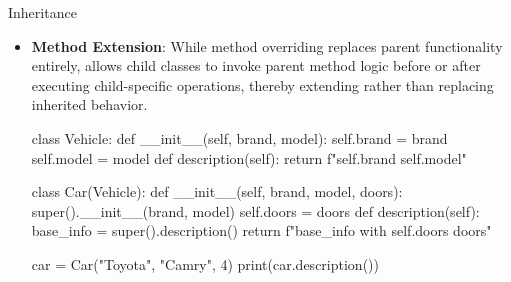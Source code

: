 \documentclass[10pt]{article}
\begin{document}
\begin{core}[label=core:inheritance]{Inheritance}
\begin{itemize}
        \item \textbf{Method Extension}: While method overriding replaces parent functionality entirely,  allows child classes to invoke parent method logic before or after executing child-specific operations, thereby extending rather than replacing inherited behavior.
        
        \begin{pyconsole}

          class Vehicle:
              def __init__(self, brand, model):
                  self.brand = brand
                  self.model = model
              def description(self):
                  return f"{self.brand} {self.model}"

          class Car(Vehicle):
              def __init__(self, brand, model, doors):
                  super().__init__(brand, model)
                  self.doors = doors
              def description(self):
                  base_info = super().description()
                  return f"{base_info} with {self.doors} doors"

          car = Car("Toyota", "Camry", 4)
          print(car.description())

        \end{pyconsole}

      \end{itemize}

    \end{core}
\end{document}
